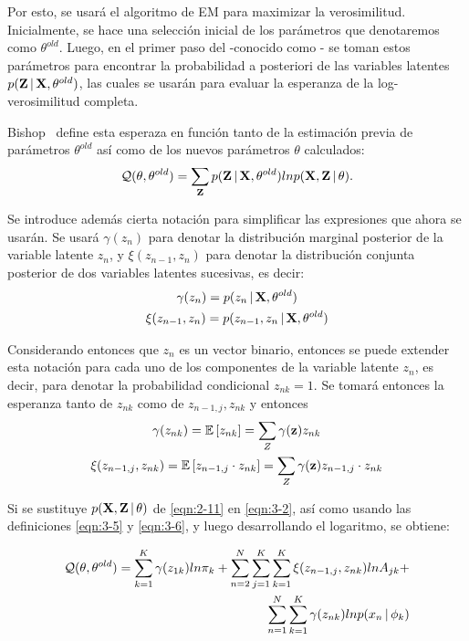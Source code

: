 Por esto, se usará el algoritmo de \ac{EM} para maximizar la verosimilitud. Inicialmente, se hace una selección inicial de los parámetros que denotaremos como $\theta^{old}$. Luego, en el primer paso del \aem -conocido como \estep- se toman estos parámetros para encontrar la probabilidad a posteriori de las variables latentes $p(\textbf{Z} \,|\, \textbf{X}, \theta^{old})$, las cuales se usarán para evaluar la esperanza de la log-verosimilitud completa.

Bishop~\cite{Bishop2006} define esta esperaza en función tanto de la estimación previa de parámetros $\theta^{old}$ así como de los nuevos parámetros $\theta$ calculados:
\begin{equation}
\mathcal{Q}(\theta, \theta^{old}) = 
  \sum_{\textbf{Z}} p(\textbf{Z} \,|\, \textbf{X}, \theta^{old})
  ln p(\textbf{X}, \textbf{Z} \,|\, \theta).
\label{eqn:3-2}
\end{equation}

Se introduce además cierta notación para simplificar las expresiones que ahora se usarán. Se usará $\gamma(z_n)$ para denotar la distribución marginal posterior de la variable latente $z_n$, y $\xi(z_{n-1}, z_n)$ para denotar la distribución conjunta posterior de dos variables latentes sucesivas, es decir: 
\begin{gather}
\gamma(z_n) = p(z_n \,|\, \textbf{X}, \theta^{old}) \label{eqn:3-3} \\
\xi(z_{n-1}, z_n) = p(z_{n-1}, z_n \,|\, \textbf{X}, \theta^{old}) \label{eqn:3-4}
\end{gather}

Considerando entonces que $z_n$ es un vector binario, entonces se puede extender esta notación para cada uno de los componentes de la variable latente $z_n$, es decir, para denotar la probabilidad condicional $z_{nk} = 1$. Se
tomará entonces la esperanza tanto de $z_{nk}$ como de $z_{n-1, j}, z_{nk}$ y entonces
\begin{gather}
\gamma(z_{nk}) = \mathbb{E} \left[ z_{nk} \right] = \sum_Z  \gamma(\textbf{z}) z_{nk} \label{eqn:3-5} \\
\xi(z_{n-1,j}, z_{nk}) = \mathbb{E} \left[z_{n-1, j} \cdot z_{nk} \right] = \sum_Z  \gamma(\textbf{z}) z_{n-1, j} 
\cdot z_{nk}
\label{eqn:3-6}
\end{gather}

Si se sustituye $p(\textbf{X}, \textbf{Z} \,|\, \theta)$ de \eqref{eqn:2-11} en \eqref{eqn:3-2}, así como usando las definiciones \eqref{eqn:3-5} y \eqref{eqn:3-6}, y luego desarrollando el logaritmo, se obtiene: 

\begin{equation}
\begin{split}
\mathcal{Q}(\theta, \theta^{old}) = 
  \sum_{k=1}^K \gamma(z_{1k}) ln \pi_k + 
  \sum_{n=2}^N \sum_{j=1}^K \sum_{k=1}^K \xi(z_{n-1,j}, z_{nk}) ln A_{jk} + \\
  \sum_{n=1}^N \sum_{k=1}^K \gamma(z_{nk}) ln p(x_n \,|\, \phi_k)
\label{eqn:3-7}
\end{split}
\end{equation}

